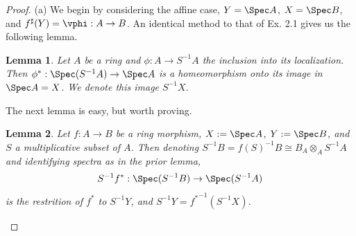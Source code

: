 \documentclass[12pt]{amsart}
\newtheorem{lemma}{Lemma}
\begin{document}
\begin{proof}
  (a) We begin by considering the affine case, $Y=\Spec A$, $X=\Spec B$, and $f^\sharp(Y)=\vphi:A\to B$.
  An identical method to that of Ex. 2.1 gives us the following lemma.
  \begin{lemma}
    Let $A$ be a ring and $\phi:A\to S^{-1}A$ the inclusion into its localization.
    Then $\phi^*:\Spec (S^{-1}A)\to \Spec A$ is a homeomorphism onto its image in $\Spec A = X$.
    We denote this image $S^{-1} X$.
  \end{lemma}
  The next lemma is easy, but worth proving.
  \begin{lemma}
    Let $f:A\to B$ be a ring morphism, $X:= \Spec A$, $Y:=\Spec B$, and $S$ a multiplicative subset of $A$.
    Then denoting $S^{-1}B =f(S)^{-1}B\cong B_A\otimes_A S^{-1}A$ and identifying spectra as in the prior lemma, 
    \[
      S^{-1}f^*:\Spec (S^{-1}B)\to \Spec(S^{-1}A)
    \]
    is the restrition of $f^*$ to $S^{-1}Y$, and $S^{-1}Y={f^*}^{-1}(S^{-1}X)$.
  \end{lemma}


\end{proof}
\end{document}

